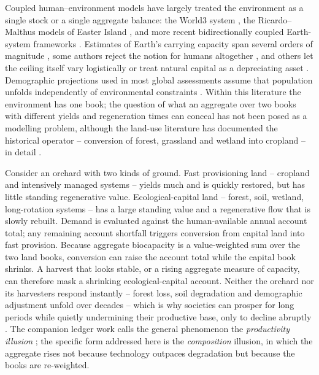 \documentclass[preprint,12pt,authoryear]{elsarticle}
\begin{document}
Coupled human--environment models have largely treated the environment as a single stock or a single aggregate balance: the World3 system \citep{Meadows1972,Meadows1974,Meadows2004}, the Ricardo--Malthus models of Easter Island \citep{BranderTaylor1998,Anderies2000}, and more recent bidirectionally coupled Earth-system frameworks \citep{Motesharrei2016,Donges2017,CalvinBondLamberty2018,HendersonLoreau2018}. Estimates of Earth's carrying capacity span several orders of magnitude \citep{Cohen1995,vdBerghRietveld2004}, some authors reject the notion for humans altogether \citep{Simon1996}, and others let the ceiling itself vary logistically \citep{Meyer1994,MeyerAusubel1999} or treat natural capital as a depreciating asset \citep{Dasgupta2021}. Demographic projections used in most global assessments assume that population unfolds independently of environmental constraints \citep{UN2022}. Within this literature the environment has one book; the question of what an aggregate over two books with different yields and regeneration times can conceal has not been posed as a modelling problem, although the land-use literature has documented the historical operator -- conversion of forest, grassland and wetland into cropland -- in detail \citep{Haberl2007,Krausmann2013,Erb2017}.

Consider an orchard with two kinds of ground. Fast provisioning land -- cropland and intensively managed systems -- yields much and is quickly restored, but has little standing regenerative value. Ecological-capital land -- forest, soil, wetland, long-rotation systems -- has a large standing value and a regenerative flow that is slowly rebuilt. Demand is evaluated against the human-available annual account total; any remaining account shortfall triggers conversion from capital land into fast provision. Because aggregate biocapacity is a value-weighted sum over the two land books, conversion can raise the account total while the capital book shrinks. A harvest that looks stable, or a rising aggregate measure of capacity, can therefore mask a shrinking ecological-capital account. Neither the orchard nor its harvesters respond instantly -- forest loss, soil degradation and demographic adjustment unfold over decades -- which is why societies can prosper for long periods while quietly undermining their productive base, only to decline abruptly \citep{Tainter1988,Diamond2005}. The companion ledger work calls the general phenomenon the \emph{productivity illusion} \citep{Abaee2026c}; the specific form addressed here is the \emph{composition} illusion, in which the aggregate rises not because technology outpaces degradation but because the books are re-weighted.
\end{document}
